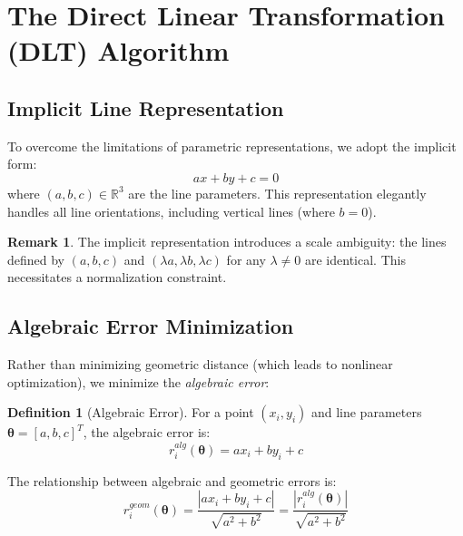 \documentclass[12pt]{article}
\renewcommand{\vec}[1]{\mathbf{#1}}
\newcommand{\abs}[1]{\left| #1 \right|}
\newcommand{\R}{\mathbb{R}}
\theoremstyle{definition}
\newtheorem{definition}{Definition}[section]
\newtheorem{remark}{Remark}[section]
\begin{document}

\newpage
\section{The Direct Linear Transformation (DLT) Algorithm}

\subsection{Implicit Line Representation}

To overcome the limitations of parametric representations, we adopt the implicit form:
\begin{equation}
    ax + by + c = 0
\end{equation}
where $(a, b, c) \in \R^3$ are the line parameters. This representation elegantly handles all line orientations, including vertical lines (where $b = 0$).

\begin{remark}
    The implicit representation introduces a scale ambiguity: the lines defined by $(a, b, c)$ and $(\lambda a, \lambda b, \lambda c)$ for any $\lambda \neq 0$ are identical. This necessitates a normalization constraint.
\end{remark}

\subsection{Algebraic Error Minimization}

Rather than minimizing geometric distance (which leads to nonlinear optimization), we minimize the \textit{algebraic error}:

\begin{definition}[Algebraic Error]
    For a point $(x_i, y_i)$ and line parameters $\vec{\theta} = [a, b, c]^T$, the algebraic error is:
    \begin{equation}
        r_i^{alg}(\vec{\theta}) = ax_i + by_i + c
    \end{equation}
\end{definition}

The relationship between algebraic and geometric errors is:
\begin{equation}
    r_i^{geom}(\vec{\theta}) = \frac{\abs{ax_i + by_i + c}}{\sqrt{a^2 + b^2}} = \frac{\abs{r_i^{alg}(\vec{\theta})}}{\sqrt{a^2 + b^2}}
\end{equation}
\end{document}
